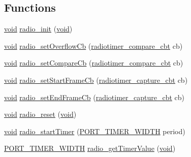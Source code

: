 \subsection*{Functions}
\begin{DoxyCompactItemize}
\item 
\hyperlink{usb__devapi_8h_afabf60e7f57651d6d595a02c75f07cd0}{void} \hyperlink{group__radio_gacfb21351bb3f0146635745bfacfe26a8}{radio\+\_\+init} (\hyperlink{usb__devapi_8h_afabf60e7f57651d6d595a02c75f07cd0}{void})
\item 
\hyperlink{usb__devapi_8h_afabf60e7f57651d6d595a02c75f07cd0}{void} \hyperlink{group__radio_gaac2272f2a27534c5223d20f7eb4dbb26}{radio\+\_\+set\+Overflow\+Cb} (\hyperlink{group__radiotimer_ga62b602325e65023c91b784f20cd2d6bc}{radiotimer\+\_\+compare\+\_\+cbt} cb)
\item 
\hyperlink{usb__devapi_8h_afabf60e7f57651d6d595a02c75f07cd0}{void} \hyperlink{group__radio_ga49e8fc5745ce8569b6d2616883579062}{radio\+\_\+set\+Compare\+Cb} (\hyperlink{group__radiotimer_ga62b602325e65023c91b784f20cd2d6bc}{radiotimer\+\_\+compare\+\_\+cbt} cb)
\item 
\hyperlink{usb__devapi_8h_afabf60e7f57651d6d595a02c75f07cd0}{void} \hyperlink{group__radio_ga7efe6846c7583e300a67ef3a336c187c}{radio\+\_\+set\+Start\+Frame\+Cb} (\hyperlink{group__radiotimer_gac7da641d0774aa21bfabefd560e42acf}{radiotimer\+\_\+capture\+\_\+cbt} cb)
\item 
\hyperlink{usb__devapi_8h_afabf60e7f57651d6d595a02c75f07cd0}{void} \hyperlink{group__radio_gabb885551de090c751381377762ae3c7c}{radio\+\_\+set\+End\+Frame\+Cb} (\hyperlink{group__radiotimer_gac7da641d0774aa21bfabefd560e42acf}{radiotimer\+\_\+capture\+\_\+cbt} cb)
\item 
\hyperlink{usb__devapi_8h_afabf60e7f57651d6d595a02c75f07cd0}{void} \hyperlink{group__radio_gaf181029cf06b94f0f4ceaafec1c3f209}{radio\+\_\+reset} (\hyperlink{usb__devapi_8h_afabf60e7f57651d6d595a02c75f07cd0}{void})
\item 
\hyperlink{usb__devapi_8h_afabf60e7f57651d6d595a02c75f07cd0}{void} \hyperlink{group__radio_ga03e630aa7be3394bc7e0607dc85d50c8}{radio\+\_\+start\+Timer} (\hyperlink{z1_2board__info_8h_abe66b9c1c60db84f2a99f2b827275f24}{P\+O\+R\+T\+\_\+\+T\+I\+M\+E\+R\+\_\+\+W\+I\+D\+TH} period)
\item 
\hyperlink{z1_2board__info_8h_abe66b9c1c60db84f2a99f2b827275f24}{P\+O\+R\+T\+\_\+\+T\+I\+M\+E\+R\+\_\+\+W\+I\+D\+TH} \hyperlink{group__radio_ga9d6377834514a8ebf0b5987bb15daa2e}{radio\+\_\+get\+Timer\+Value} (\hyperlink{usb__devapi_8h_afabf60e7f57651d6d595a02c75f07cd0}{void})

\end{DoxyCompactItemize}

